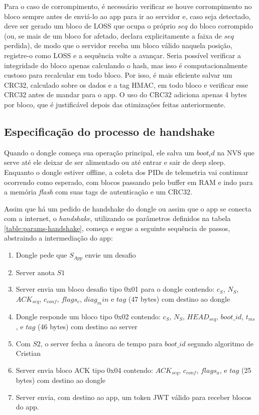 \documentclass[
	12pt,
	article,			%
	oneside,
	a4paper,
	english,
	brazil				%
	]{abntex2}
\begin{document}
Para o caso de corrompimento, é necessário verificar se houve corrompimento no bloco sempre antes de enviá-lo ao app para ir ao servidor e, caso seja detectado, deve ser gerado um bloco de LOSS 
que ocupa o próprio $seq$ do bloco corrompido (ou, se mais de um bloco for afetado, declara explicitamente a faixa de $seq$ perdida), de modo que o servidor receba um bloco válido naquela posição, registre-o como LOSS e a sequência volte a avançar. Seria possível verificar a integridade do bloco apenas calculando o hash, mas isso é computacionalmente custoso
para recalcular em todo bloco. Por isso, é mais eficiente salvar um CRC32, calculado sobre os dados e a tag HMAC, em todo bloco e verificar esse CRC32 antes de mandar para o app. O uso do CRC32 adiciona apenas 4 bytes por
bloco, que é justificável depois das otimizações feitas anteriormente.

\subsection{Especificação do processo de handshake}

Quando o dongle começa sua operação principal, ele salva um $boot_id$ na NVS que serve até ele deixar de ser alimentado ou até entrar e sair de deep sleep.
Enquanto o dongle estiver offline, a coleta dos PIDs de telemetria vai continuar ocorrendo como esperado, com blocos passando pelo buffer em RAM e indo
para a memória \textit{flash} com suas tags de autenticação e um CRC32.

Assim que há um pedido de handshake do dongle ou assim que o app se conecta com a internet, o \textit{handshake}, utilizando os parâmetros definidos na tabela \ref{table:params-handshake},
começa e segue a seguinte sequência de passos, abstraindo a intermediação do app:

\begin{enumerate}
	\item Dongle pede que $S_{App}$ envie um desafio
	\item Server anota $S1$
	\item Server envia um bloco desafio tipo 0x01 para o dongle contendo: $c_S$, $N_S$, $ACK_{seq}$, $c_{conf}$, $flags_c$, $diag_min$ e $tag$ (47 bytes) com destino ao dongle
	\item Dongle responde um bloco tipo 0x02 contendo: $c_S$, $N_S$, $HEAD_{seq}$, $boot\_id$, $t_{ms}$, e $tag$ (46 bytes) com destino ao server
	\item Com $S2$, o server fecha a âncora de tempo para $boot\_id$ segundo algoritmo de Cristian
	\item Server envia bloco ACK tipo 0x04 contendo: $ACK_{seq}$, $c_{conf}$, $flags_a$, e $tag$ (25 bytes) com destino ao dongle
	\item Server envia, com destino ao app, um token JWT válido para receber blocos do app.
\end{enumerate}
\end{document}
